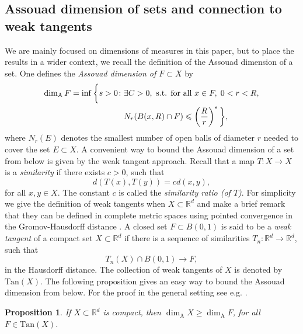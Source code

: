 \documentclass{PRM}
\newcommand{\field}[1]{\mathbb{#1}}
\newcommand{\R}{\field{R}}
\newcommand{\adim}{\dim_{\mathrm{A}}}
\theoremstyle{plain}
\newtheorem{prop}[thm]{Proposition}
\theoremstyle{definition}
\theoremstyle{remark}
\begin{document}
\subsection{Assouad dimension of sets and connection to weak tangents}
We are mainly focused on dimensions of measures in this paper, but to place the results in a wider context, we recall the definition of the Assouad dimension of a set. One defines the \emph{Assouad dimension of $F\subset X$} by
\begin{align*}
    \adim F=\inf\bigg\{ s>0\colon& \exists C>0,\textnormal{ s.t. for all }x\in F,\; 0<r<R,\\
    &N_r(B(x,R)\cap F)\leq \left(\frac{R}{r}\right)^s\bigg\},
\end{align*}
where $N_r(E)$ denotes the smallest number of open balls of diameter $r$ needed to cover the set $E\subset X$.
A convenient way to bound the Assouad dimension of a set from below is given by the weak tangent approach. Recall that a map $T\colon X\to X$ is a \emph{similarity} if there exists $c>0$, such that
\begin{equation*}
    d(T(x),T(y))=c d(x,y),
\end{equation*}
for all $x,y\in X$. The constant $c$ is called the \emph{similarity ratio (of $T$)}.  For simplicity we give the definition of weak tangents when $X\subset \R^d$ and make a brief remark that they can be defined in complete metric spaces using pointed convergence in the Gromov-Hausdorff distance \cite{KL,MT}.  A closed set $F\subset B(0,1)$ is said to be a \emph{weak tangent} of a compact set $X\subset \R^d$ if there is a sequence of similarities $T_n\colon \R^d\to\R^d$, such that
\begin{equation*}
    T_n(X)\cap B(0,1)\to F,
\end{equation*}
in the Hausdorff distance. The collection of weak tangents of $X$ is denoted by $\mathrm{Tan}(X)$. The following proposition gives an easy way to bound the Assouad dimension from below. For the proof in the general setting see e.g. \cite[Proposition 6.1.5]{MT}.

\begin{prop}\label{prop:weaktangent}
If $X\subset \R^d$ is compact, then $\dim_{\mathrm{A}} X\geq \dim_{\mathrm{A}}F$, for all $F\in\mathrm{Tan}(X)$.
\end{prop}
\end{document}
